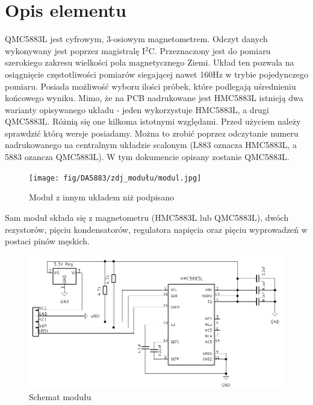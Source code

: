 \documentclass[11pt, a4paper]{article}
\author{Antoni Borowski}
\institute{Instytut Robotyki i Inteligencji Maszynowej}
\begin{document}
\newpage

\section*{Opis elementu} 
QMC5883L jest cyfrowym, 3-osiowym magnetometrem. Odczyt danych wykonywany jest poprzez magistralę I$^{2}$C. Przeznaczony jest do pomiaru szerokiego zakresu wielkości pola magnetycznego Ziemi. Układ ten pozwala na osiągnięcie częstotliwości pomiarów siegającej nawet 160Hz w trybie pojedynczego pomiaru. Posiada możliwość wyboru ilości próbek, które podlegają uśrednieniu końcowego wyniku.
Mimo, że na PCB nadrukowane jest HMC5883L istnieją dwa warianty opisywanego układu - jeden wykorzystuje HMC5883L, a drugi QMC5883L. Różnią się one kilkoma istotnymi względami. Przed użyciem należy sprawdzić którą wersje posiadamy. Można to zrobić poprzez odczytanie numeru nadrukowanego na centralnym układzie scalonym (L883 oznacza HMC5883L, a 5883 ozancza QMC5883L).
W tym dokumencie opisany zostanie QMC5883L.\\
\vspace{0.5cm}
\begin{figure}[h!]
    \centering
    \texttt{[image: fig/DA5883/zdj\_modułu/modul.jpg]}
    \caption{Moduł z innym układem niż podpisano \cite{ArduinoModules:grab}}
    \label{fig:my_label}
\end{figure}
\newline
Sam moduł składa się z magnetometru (HMC5883L lub QMC5883L), dwóch rezystorów, pięciu kondensatorów, regulatora napięcia oraz pięciu wyprowadzeń w postaci pinów męskich.
\vspace{0.5cm}
\begin{figure}[h!]
    \centering
    \includegraphics[width=.95\textwidth]{fig/DA5883/polaczenie_modulu/schemat.png}
    \caption{Schemat modułu}
    \label{fig:my_label}
\end{figure}
\newpage
\end{document}
